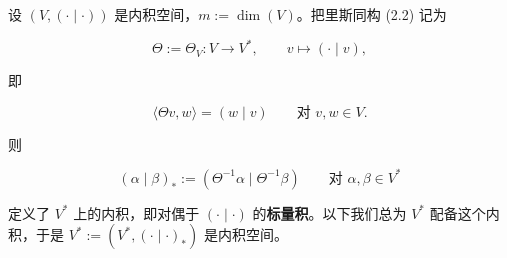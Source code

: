 设 $ (V, (\cdot\mid\cdot)) $ 是内积空间，$ m := \dim(V) $。把里斯同构 (2.2) 记为

\[
\Theta := \Theta_{V} : V \to V^{*} , \qquad v \mapsto (\cdot\mid v) ,
\]

即

\begin{equation}
\langle \Theta v, w\rangle = (w\mid v) \qquad \text{对 } v,w \in V .\tag{2.12}
\end{equation}

则

\begin{equation}
(\alpha\mid\beta)_{*} := (\Theta^{-1}\alpha\mid\Theta^{-1}\beta) \qquad \text{对 } \alpha,\beta \in V^{*}\tag{2.13}
\end{equation}

定义了 $ V^{*} $ 上的内积，即对偶于 $ (\cdot\mid\cdot) $ 的\textbf{标量积}。以下我们总为 $ V^{*} $ 配备这个内积，于是 $ V^{*} := (V^{*}, (\cdot\mid\cdot)_{*}) $ 是内积空间。

